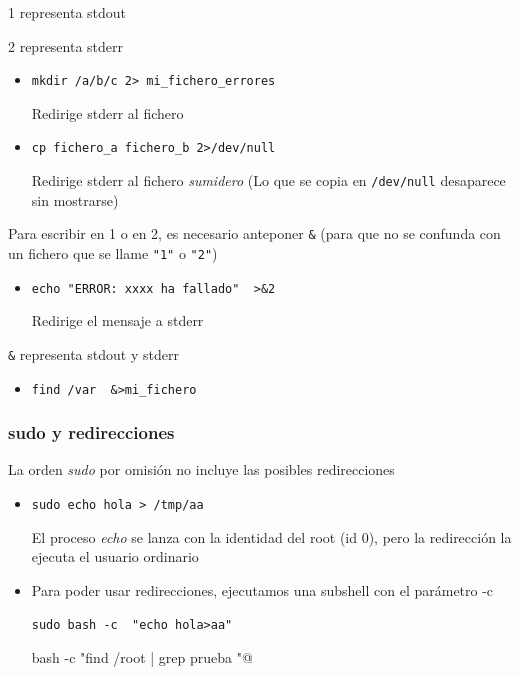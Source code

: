 \documentclass[ucs]{beamer}
\begin{document}
\begin{frame}[fragile]
1 representa stdout

2 representa stderr
\begin{itemize}
\item
\verb|mkdir /a/b/c 2> mi_fichero_errores |

Redirige stderr al fichero

\item
\verb|cp fichero_a fichero_b 2>/dev/null|

Redirige stderr al fichero \emph{sumidero} (Lo que se
copia en \verb|/dev/null| desaparece sin mostrarse)
\end{itemize}

Para escribir en 1 o en 2, es necesario anteponer \verb|&|
(para que no se confunda con un fichero que se llame \verb|"1"| o 
\verb|"2"|)
\begin{itemize}
\item
\verb|echo "ERROR: xxxx ha fallado"  >&2|

Redirige el mensaje a stderr
\end{itemize}

\verb|&| representa stdout y stderr

\begin{itemize}
\item
\verb|find /var  &>mi_fichero|
\end{itemize}

\end{frame}

\begin{frame}[fragile]
\frametitle{sudo y redirecciones}
La orden \emph{sudo} por omisión no incluye las posibles redirecciones
\begin{itemize}
\item
\verb|sudo echo hola > /tmp/aa|

El proceso \emph{echo} se lanza con la identidad del root  (id 0), 
pero la redirección la ejecuta el usuario ordinario


\item
Para poder usar redirecciones, ejecutamos una subshell con el parámetro -c

\verb|sudo bash -c  "echo hola>aa"|

\verb@sudo bash -c  "find /root | grep prueba "@


\end{itemize}

\end{frame}
\end{document}
